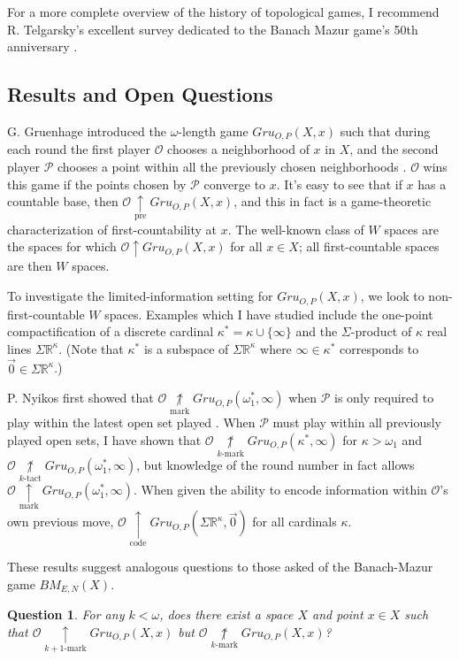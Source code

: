 \documentclass[11pt]{amsart}
\theoremstyle{plain}
\newtheorem{question}{Question}
\newcommand{\win}{\uparrow}
\newcommand{\prewin}{\underset{\text{pre}}{\uparrow}}
\newcommand{\markwin}{\underset{\text{mark}}{\uparrow}}
\newcommand{\kmarkwin}[1]{\underset{#1\text{-mark}}{\uparrow}}
\newcommand{\codewin}{\underset{\text{code}}{\uparrow}}
\newcommand{\notmarkwin}{\underset{\text{mark}}{\not\uparrow}}
\newcommand{\notkmarkwin}[1]{\underset{#1\text{-mark}}{\not\uparrow}}
\newcommand{\notktactwin}[1]{\underset{#1\text{-tact}}{\not\uparrow}}
\newcommand{\oneptcomp}[1]{#1^*}
\newcommand{\gruConGame}[2]{Gru_{O,P}(#1,#2)}
\newcommand{\<}{\langle}
\renewcommand{\>}{\rangle}
\newcommand{\mb}[1]{\mathbb{#1}}
\newcommand{\pl}[1]{\mathscr{#1}}
\newcommand{\bmGame}[1]{{BM}_{E,N}(#1)}
\begin{document}
For a more complete overview of the history of topological games, I recommend
R. Telgarsky's excellent survey dedicated to the Banach Mazur game's 50th
anniversary \cite{MR892457}.

\subsection*{Results and Open Questions}

G. Gruenhage introduced
the $\omega$-length game $\gruConGame{X}{x}$ such that during
each round the first player $\pl O$ chooses a neighborhood of $x$ in $X$, and
the second player $\pl P$ chooses a point within all the previously chosen
neighborhoods \cite{MR0413049}.
$\pl O$ wins this game if the points chosen by $\pl P$
converge to $x$. It's easy to see that if $x$ has a countable base,
then $\pl O \prewin \gruConGame{X}{x}$, and this in fact is
a game-theoretic characterization of first-countability at $x$. The well-known
class of $W$ spaces are the spaces for which $\pl O \win \gruConGame{X}{x}$
for all $x\in X$; all first-countable spaces are then $W$ spaces.

To investigate the limited-information setting for $\gruConGame{X}{x}$, we look
to non-first-countable $W$ spaces. Examples which I have studied include the
one-point compactification of a discrete cardinal
$\oneptcomp\kappa=\kappa\cup\{\infty\}$ and the
$\Sigma$-product of $\kappa$ real lines $\Sigma\mb R^\kappa$. (Note that
$\oneptcomp\kappa$ is a subspace of $\Sigma\mb R^\kappa$ where
$\infty\in\oneptcomp\kappa$ corresponds to $\vec0\in\Sigma\mb R^\kappa$.)

P. Nyikos first showed that
$\pl O\notmarkwin\gruConGame{\oneptcomp\omega_1}{\infty}$ when $\pl P$ is only
required to play within the latest open set played \cite{MR1031771}.
When $\pl P$ must play within all previously played open sets, I have shown
that $\pl O\notkmarkwin{k}\gruConGame{\oneptcomp\kappa}{\infty}$ for
$\kappa>\omega_1$ and
$\pl O\notktactwin{k}\gruConGame{\oneptcomp\omega_1}{\infty}$, but knowledge
of the round number in fact allows
$\pl O\markwin\gruConGame{\oneptcomp\omega_1}{\infty}$. When given the ability
to encode information within $\pl O$'s own previous move,
$\pl O\codewin\gruConGame{\Sigma\mb R^\kappa}{\vec0}$ for all cardinals
$\kappa$.

These results suggest analogous questions to those asked of the
Banach-Mazur game $\bmGame{X}$.

\begin{question}
  For any $k<\omega$, does there exist a space $X$ and point $x\in X$ such that
  $\pl O\kmarkwin{k+1}\gruConGame{X}{x}$
  but $\pl O\notkmarkwin{k}\gruConGame{X}{x}$?
\end{question}
\end{document}
